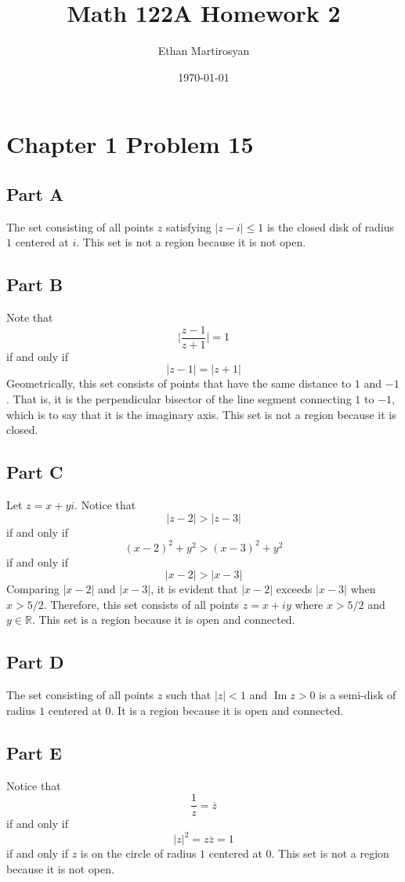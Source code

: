 \documentclass[12pt]{article}
\newcommand{\R}{\mathbb{R}}
\DeclareMathOperator{\imag}{Im}
\begin{document}
 
\title{Math 122A Homework 2}
\author{Ethan Martirosyan}
\date{\today}
\maketitle
{}
\hfuzz=50pt
\section*{Chapter 1 Problem 15}
\subsection*{Part A}
The set consisting of all points $z$ satisfying $\vert z - i \vert \leq 1$ is the closed disk of radius $1$ centered at $i$. This set is not a region because it is not open.
\subsection*{Part B}
Note that 
\[
\bigg \vert \frac{z-1}{z+1} \bigg \vert = 1
\] if and only if
\[
\vert z - 1 \vert = \vert z + 1 \vert
\] Geometrically, this set consists of points that have the same distance to $1$ and $-1$. That is, it is the perpendicular bisector of the line segment connecting $1$ to $-1$, which is to say that it is the imaginary axis. This set is not a region because it is closed.
\subsection*{Part C}
Let $z= x+yi$. Notice that
\[
\vert z- 2 \vert > \vert z- 3 \vert
\] if and only if
\[
(x-2)^2+y^2 > (x-3)^2 + y^2
\] if and only if
\[
\vert x - 2 \vert > \vert x - 3 \vert
\] Comparing $\vert x - 2\vert$ and $\vert x - 3\vert$, it is evident that $\vert x-2\vert$ exceeds $\vert x-3 \vert$ when $x > 5/2$. Therefore, this set consists of all points $z=x+iy$ where $x > 5/2$ and $y \in \R$. This set is a region because it is open and connected.
\subsection*{Part D}
The set consisting of all points $z$ such that $\vert z \vert < 1$ and $\imag z > 0$ is a semi-disk of radius $1$ centered at $0$. It is a region because it is open and connected.
\subsection*{Part E}
Notice that
\[
\frac{1}{z} = \overline{z}
\] if and only if
\[
\vert z \vert^2 = z\overline{z} = 1
\] if and only if $z$ is on the circle of radius $1$ centered at $0$. This set is not a region because it is not open.
\newpage
\end{document}
